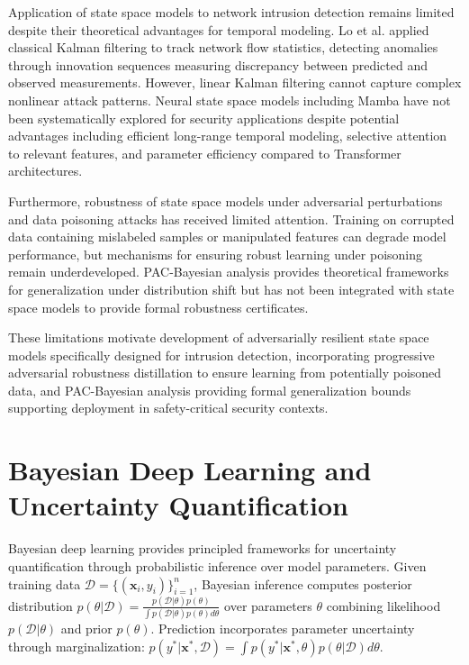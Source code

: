 Application of state space models to network intrusion detection remains limited despite their theoretical advantages for temporal modeling. Lo et al. applied classical Kalman filtering to track network flow statistics, detecting anomalies through innovation sequences measuring discrepancy between predicted and observed measurements. However, linear Kalman filtering cannot capture complex nonlinear attack patterns. Neural state space models including Mamba have not been systematically explored for security applications despite potential advantages including efficient long-range temporal modeling, selective attention to relevant features, and parameter efficiency compared to Transformer architectures.

Furthermore, robustness of state space models under adversarial perturbations and data poisoning attacks has received limited attention. Training on corrupted data containing mislabeled samples or manipulated features can degrade model performance, but mechanisms for ensuring robust learning under poisoning remain underdeveloped. PAC-Bayesian analysis provides theoretical frameworks for generalization under distribution shift but has not been integrated with state space models to provide formal robustness certificates.

These limitations motivate development of adversarially resilient state space models specifically designed for intrusion detection, incorporating progressive adversarial robustness distillation to ensure learning from potentially poisoned data, and PAC-Bayesian analysis providing formal generalization bounds supporting deployment in safety-critical security contexts.

\section{Bayesian Deep Learning and Uncertainty Quantification}
\label{sec:lit_bayesian}

Bayesian deep learning provides principled frameworks for uncertainty quantification through probabilistic inference over model parameters. Given training data $\mathcal{D} = \{(\mathbf{x}_i, y_i)\}_{i=1}^n$, Bayesian inference computes posterior distribution $p(\theta|\mathcal{D}) = \frac{p(\mathcal{D}|\theta)p(\theta)}{\int p(\mathcal{D}|\theta)p(\theta)d\theta}$ over parameters $\theta$ combining likelihood $p(\mathcal{D}|\theta)$ and prior $p(\theta)$. Prediction incorporates parameter uncertainty through marginalization: $p(y^*|\mathbf{x}^*, \mathcal{D}) = \int p(y^*|\mathbf{x}^*, \theta)p(\theta|\mathcal{D})d\theta$.

